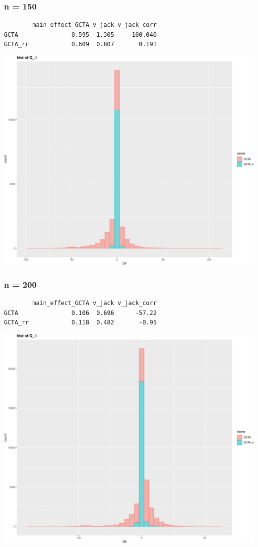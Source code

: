 \documentclass[]{article}
\begin{document}
\subsubsection{n = 150}\label{n-150-1}

\begin{verbatim}
        main_effect_GCTA v_jack v_jack_corr
GCTA               0.595  1.305    -100.040
GCTA_rr            0.609  0.807       0.191
\end{verbatim}

\includegraphics{GCTA_and_rr_v_jack_correction_files/figure-latex/unnamed-chunk-11-1.pdf}
\newpage

\subsubsection{n = 200}\label{n-200-1}

\begin{verbatim}
        main_effect_GCTA v_jack v_jack_corr
GCTA               0.106  0.696      -57.22
GCTA_rr            0.118  0.482       -0.95
\end{verbatim}

\includegraphics{GCTA_and_rr_v_jack_correction_files/figure-latex/unnamed-chunk-12-1.pdf}
\end{document}
